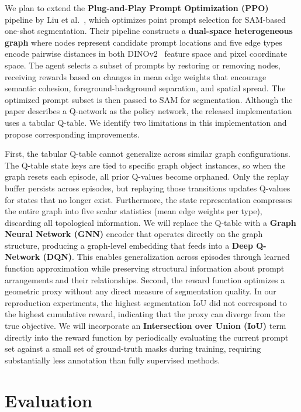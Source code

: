 \documentclass[12pt]{article}
\begin{document}
We plan to extend the \textbf{Plug-and-Play Prompt Optimization (PPO)} pipeline by Liu et al.~\cite{Liu2025PPO}, which optimizes point prompt selection for SAM-based one-shot segmentation. Their pipeline constructs a \textbf{dual-space heterogeneous graph} where nodes represent candidate prompt locations and five edge types encode pairwise distances in both DINOv2~\cite{Oquab2024DINOv2} feature space and pixel coordinate space. The agent selects a subset of prompts by restoring or removing nodes, receiving rewards based on changes in mean edge weights that encourage semantic cohesion, foreground-background separation, and spatial spread. The optimized prompt subset is then passed to SAM for segmentation. Although the paper describes a Q-network as the policy network, the released implementation uses a tabular Q-table. We identify two limitations in this implementation and propose corresponding improvements.

First, the tabular Q-table cannot generalize across similar graph configurations. The Q-table state keys are tied to specific graph object instances, so when the graph resets each episode, all prior Q-values become orphaned. Only the replay buffer persists across episodes, but replaying those transitions updates Q-values for states that no longer exist. Furthermore, the state representation compresses the entire graph into five scalar statistics (mean edge weights per type), discarding all topological information. We will replace the Q-table with a \textbf{Graph Neural Network (GNN)} encoder that operates directly on the graph structure, producing a graph-level embedding that feeds into a \textbf{Deep Q-Network (DQN)}. This enables generalization across episodes through learned function approximation while preserving structural information about prompt arrangements and their relationships. Second, the reward function optimizes a geometric proxy without any direct measure of segmentation quality. In our reproduction experiments, the highest segmentation IoU did not correspond to the highest cumulative reward, indicating that the proxy can diverge from the true objective. We will incorporate an \textbf{Intersection over Union (IoU)} term directly into the reward function by periodically evaluating the current prompt set against a small set of ground-truth masks during training, requiring substantially less annotation than fully supervised methods.

\section{Evaluation}
\end{document}
